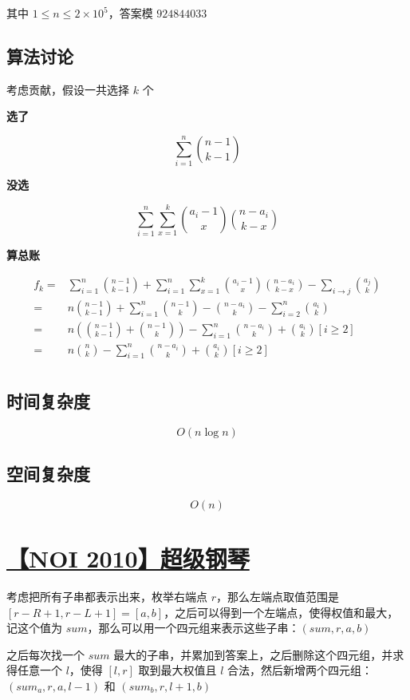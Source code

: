 \documentclass[UTF8]{article}
\begin{document}
其中 $1 \le n \le 2 \times 10^5$，答案模 $924844033$

\subsection{算法讨论}

考虑贡献，假设一共选择 $k$ 个

\textbf{选了}

$$
\sum_{i=1}^{n} {n-1 \choose k-1}
$$

\textbf{没选}

$$
\sum_{i=1}^{n}\sum_{x=1}^{k}{a_i-1 \choose x}{n-a_i \choose k-x}
$$

\textbf{算总账}

$$
\begin{aligned}
f_k
=&\sum_{i=1}^{n} {n-1 \choose k-1}+\sum_{i=1}^{n}\sum_{x=1}^{k}{a_i-1 \choose x}{n-a_i \choose k-x}-\sum_{i \to j} {a_j \choose k} \\
=&n{n-1 \choose k-1}+\sum_{i=1}^{n} {n-1 \choose k}-{n-a_i \choose k} -\sum_{i=2}^{n} {a_i \choose k}  \\
=&n \left({n-1 \choose k-1}+{n-1 \choose k}\right)-\sum_{i=1}^{n} {n-a_i \choose k}+ {a_i \choose k}[i \ge 2] \\
=&n {n \choose k}-\sum_{i=1}^{n} {n-a_i \choose k} + {a_i \choose k} [i \ge 2] \\
\end{aligned}
$$

\subsection{时间复杂度}

$$
O(n \log n)
$$

\subsection{空间复杂度}

$$
O(n)
$$

\section{\href{https://www.lydsy.com/JudgeOnline/problem.php?id=2006}{【NOI 2010】超级钢琴}}

考虑把所有子串都表示出来，枚举右端点 $r$，那么左端点取值范围是 $[r-R+1,r-L+1]=[a, b]$，之后可以得到一个左端点，使得权值和最大，记这个值为 $sum$，那么可以用一个四元组来表示这些子串：$(sum, r, a, b)$

之后每次找一个 $sum$ 最大的子串，并累加到答案上，之后删除这个四元组，并求得任意一个 $l$，使得 $[l, r]$ 取到最大权值且 $l$ 合法，然后新增两个四元组：$(sum_a, r, a, l-1)$ 和 $(sum_b, r, l + 1, b)$
\end{document}

